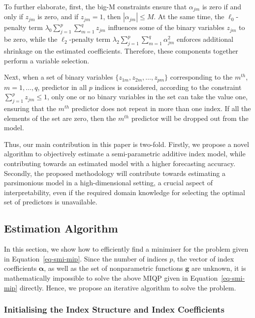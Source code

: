 \documentclass[11pt,a4paper,]{article}
\begin{document}
To further elaborate, first, the big-M constraints ensure that
\(\alpha_{jm}\) is zero if and only if \(z_{jm}\) is zero, and if
\(z_{jm} = 1\), then \(\left |\alpha_{jm}\right | \le M\). At the same
time, the \(\ell_{0}\)-penalty term
\(\lambda_{0}\sum_{j = 1}^{p}\sum_{m = 1}^{q}z_{jm}\) influences some of
the binary variables \(z_{jm}\) to be zero, while the
\(\ell_{2}\)-penalty term
\(\lambda_{2}\sum_{j = 1}^{p}\sum_{m = 1}^{q}\alpha_{jm}^{2}\) enforces
additional shrinkage on the estimated coefficients. Therefore, these
components together perform a variable selection.

Next, when a set of binary variables
\(\{z_{1m}, z_{2m}, \dots, z_{pm}\}\) corresponding to the \(m^{th}\),
\(m = 1, \dots, q\), predictor in all \(p\) indices is considered,
according to the constraint \(\sum_{j = 1}^{p}z_{jm} \le 1\), only one
or no binary variables in the set can take the value one, ensuring that
the \(m^{th}\) predictor does not repeat in more than one index. If all
the elements of the set are zero, then the \(m^{th}\) predictor will be
dropped out from the model.

Thus, our main contribution in this paper is two-fold. Firstly, we
propose a novel algorithm to objectively estimate a semi-parametric
additive index model, while contributing towards an estimated model with
a higher forecasting accuracy. Secondly, the proposed methodology will
contribute towards estimating a parsimonious model in a high-dimensional
setting, a crucial aspect of interpretability, even if the required
domain knowledge for selecting the optimal set of predictors is
unavailable.

\hypertarget{estimation-algorithm}{%
\subsection{Estimation Algorithm}\label{estimation-algorithm}}

In this section, we show how to efficiently find a minimiser for the
problem given in Equation~\ref{eq-smi-mip}. Since the number of indices
\(p\), the vector of index coefficients \(\bm{\alpha}\), as well as the
set of nonparametric functions \(\bm{g}\) are unknown, it is
mathematically impossible to solve the above MIQP given in
Equation~\ref{eq-smi-mip} directly. Hence, we propose an iterative
algorithm to solve the problem.

\hypertarget{sec-step1}{%
\subsubsection{Initialising the Index Structure and Index
Coefficients}\label{sec-step1}}
\end{document}
